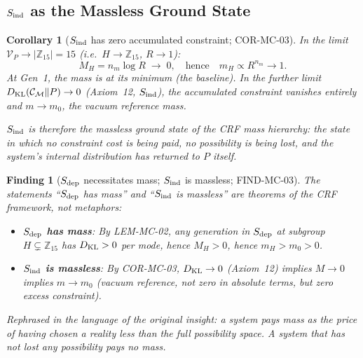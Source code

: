 \documentclass[12pt, a4paper]{article}
\newtheorem{corollary}{Corollary}[section]
\newtheorem{finding}{Finding}[section]
\begin{document}
\subsection{$S_{\rm ind}$ as the Massless Ground State}
\label{zc16:sec:sind}

\begin{corollary}[$S_{\rm ind}$ has zero accumulated constraint;
  COR-MC-03]
\label{zc16:cor:sind-massless}
In the limit $\mathcal{V}_P \to |\mathbb{Z}_{15}| = 15$
(i.e.\ $H \to \mathbb{Z}_{15}$, $R \to 1$):
\[
  M_H = n_m \log R \;\to\; 0,
  \quad\text{hence}\quad m_H \propto R^{n_m} \to 1.
\]
At Gen~1, the mass is at its minimum (the baseline). In the
further limit $D_{\rm KL}(\mathcal{C}_\mathcal{M} \| P) \to 0$
(Axiom~12, $S_{\rm ind}$), the accumulated constraint vanishes
entirely and $m \to m_0$, the vacuum reference mass.

$S_{\rm ind}$ is therefore the \emph{massless ground state}
of the CRF mass hierarchy: the state in which no constraint
cost is being paid, no possibility is being lost, and the
system's internal distribution has returned to $P$ itself.
\end{corollary}

\begin{finding}[$S_{\rm dep}$ necessitates mass;
  $S_{\rm ind}$ is massless; FIND-MC-03]
\label{zc16:find:dep-mass}
The statements ``$S_{\rm dep}$ has mass'' and
``$S_{\rm ind}$ is massless'' are theorems of the
CRF framework, not metaphors:

\begin{itemize}[leftmargin=*, noitemsep]
  \item \textbf{$S_{\rm dep}$ has mass}: By LEM-MC-02,
    any generation in $S_{\rm dep}$ at subgroup $H \subsetneq
    \mathbb{Z}_{15}$ has $D_{\rm KL} > 0$ per mode, hence
    $M_H > 0$, hence $m_H > m_0 > 0$.
  \item \textbf{$S_{\rm ind}$ is massless}: By COR-MC-03,
    $D_{\rm KL} \to 0$ (Axiom~12) implies $M \to 0$ implies
    $m \to m_0$ (vacuum reference, not zero in absolute terms,
    but zero \emph{excess} constraint).
\end{itemize}

Rephrased in the language of the original insight:
\emph{a system pays mass as the price of having chosen
a reality less than the full possibility space.
A system that has not lost any possibility pays no mass.}
\end{finding}
\end{document}
